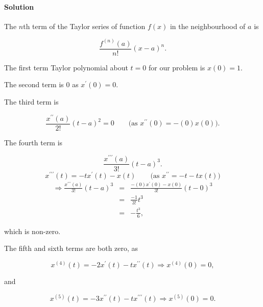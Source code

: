 
\paragraph{Solution}

The $n$th term of the Taylor series of function $f\left(x\right)$ in the neighbourhood of $a$ is

\[\frac{f^{\left(n\right)}\left(a\right)}{n!}\left(x-a\right)^n.\]

The first term Taylor polynomial about $t=0$ for our problem is $x\left(0\right)=1$.

The second term is $0$ as $x^\prime\left(0\right)=0$.

The third term is

\[\frac{x^{\prime\prime}\left(a\right)}{2!}\left(t-a\right)^2=0\qquad\mbox{(as }x^{\prime\prime}\left(0\right)=-\left(0\right)x\left(0\right)\mbox{).}\]

The fourth term is

\[\frac{x^{\prime\prime\prime}\left(a\right)}{3!}\left(t-a\right)^3.\]
\[x^{\prime\prime\prime}\left(t\right)=-tx^\prime\left(t\right)-x\left(t\right)\qquad\mbox{(as }x^{\prime\prime}=-t-tx\left(t\right)\mbox{)}\]
\begin{eqnarray*}
	\Rightarrow\frac{x^{\prime\prime\prime}\left(a\right)}{3!}\left(t-a\right)^3&=&\frac{-\left(0\right)x^\prime\left(0\right)-x\left(0\right)}{3!}\left(t-0\right)^3\\
	&=&\frac{-1}{3!}t^3\\
	&=&-\frac{t^3}{6},
\end{eqnarray*}

which is non-zero.

The fifth and sixth terms are both zero, as

\[x^{\left(4\right)}\left(t\right)=-2x^\prime\left(t\right)-tx^{\prime\prime}\left(t\right)\Rightarrow x^{\left(4\right)}\left(0\right)=0,\]

and

\[x^{\left(5\right)}\left(t\right)=-3x^{\prime\prime}\left(t\right)-tx^{\prime\prime\prime}\left(t\right)\Rightarrow x^{\left(5\right)}\left(0\right)=0.\]

